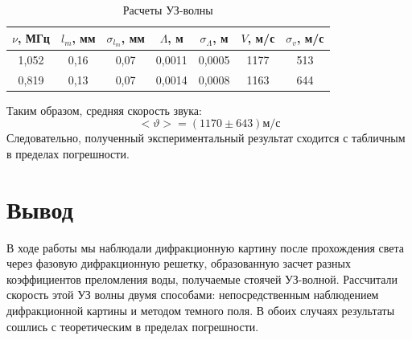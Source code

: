 \documentclass[a4paper,12pt]{article} %
\theoremstyle{plain} %
\theoremstyle{definition} %
\theoremstyle{remark} %
\begin{document}
\begin{enumerate}
	\begin{table}[H]
		\centering
		\begin{tabular}{|c|c|c|c|c|c|c|}
			\hline
			$\nu$, МГц & $l_m$, мм & $\sigma_{l_m}$, мм & $\Lambda$, м & $\sigma_{\Lambda}$, м & $V$, м/с & $\sigma_{v}$, м/с  \\ \hline
			1,052 & 0,16 & 0,07 & 0,0011 & 0,0005 & 1177 & 513  \\ \hline
			0,819 & 0,13 & 0,07 & 0,0014 & 0,0008 & 1163 & 644  \\ \hline
		\end{tabular}
		\caption{Расчеты УЗ-волны}
	\end{table}
	
	Таким образом, средняя скорость звука:
	\[ <\vartheta>=(1170 \pm 643) м/с\]
	 Следовательно, полученный экспериментальный результат сходится с табличным в пределах погрешности. 

\end{enumerate} 
	
\section*{Вывод}
В ходе работы мы наблюдали дифракционную картину после прохождения света через фазовую дифракционную решетку, образованную засчет разных коэффициентов преломления воды, получаемые стоячей УЗ-волной. Рассчитали скорость этой УЗ волны двумя способами: непосредственным наблюдением дифракционной картины и методом темного поля. В обоих случаях результаты сошлись с теоретическим в пределах погрешности. 
\end{document}
